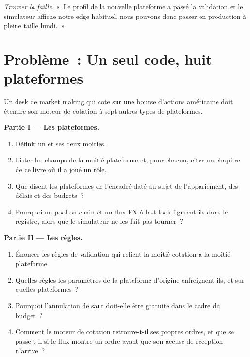 \begin{exercise}[$\star\star\star$]\label{exo:hf:a-venue-playbook:8}
\emph{Trouver la faille.} «~Le profil de la nouvelle plateforme a passé la validation et le simulateur affiche notre edge habituel, nous pouvons donc passer en production à pleine taille lundi.~»
\end{exercise}

\section{Problème~: Un seul code, huit plateformes}

\begin{problem}\label{pb:hf:a-venue-playbook:1}
Un desk de market making qui cote sur une bourse d'actions américaine doit étendre son moteur de cotation à sept autres types de plateformes.

\medskip\noindent\textbf{Partie I --- Les plateformes.}
\begin{enumerate}
\item Définir un  et ses deux moitiés.
\item Lister les champs de la moitié plateforme et, pour chacun, citer un chapitre de ce livre où il a joué un rôle.
\item Que disent les plateformes de l'encadré daté au sujet de l'appariement, des délais et des budgets~?
\item Pourquoi un pool on-chain et un flux FX à last look figurent-ils dans le registre, alors que le simulateur ne les fait pas tourner~?
\end{enumerate}

\medskip\noindent\textbf{Partie II --- Les règles.}
\begin{enumerate}[resume]
\item Énoncer les règles de validation qui relient la moitié cotation à la moitié plateforme.
\item Quelles règles les paramètres de la plateforme d'origine enfreignent-ils, et sur quelles plateformes~?
\item Pourquoi l'annulation de saut doit-elle être gratuite dans le cadre du budget~?
\item Comment le moteur de cotation retrouve-t-il ses propres ordres, et que se passe-t-il si le flux montre un ordre avant que son accusé de réception n'arrive~?
\end{enumerate}


\end{problem}
